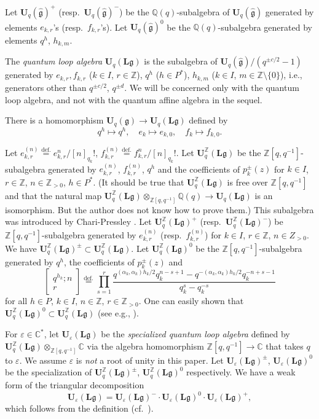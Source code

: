 \documentclass[12pt]{amsart}
\def\Bbb{\mathbb}
\theoremstyle{definition}
\theoremstyle{remark}
\numberwithin{equation}{subsection}
\newcommand{\defeq}{\overset{\operatorname{\scriptstyle def.}}{=}}
\newcommand{\C}{{\Bbb C}}
\newcommand{\Z}{{\Bbb Z}}
\newcommand{\Q}{{\Bbb Q}}
\newcommand{\Uq}{{\mathbf U}_q(\mathfrak g)} %
\newcommand{\Ua}{{\mathbf U}_q(\widehat{\mathfrak g})} %
\newcommand{\Ul}{{\mathbf U}_q({\mathbf L}{\mathfrak g})} %
\newcommand{\Uli}{{\mathbf U}^{\Z}_q({\mathbf L}\mathfrak g)}
\newcommand{\Ule}{{\mathbf U}_{\varepsilon}({\mathbf L}\mathfrak g)}
\begin{document}
Let $\Ua^+$ (resp.\ $\Ua^-$) be the $\Q(q)$-subalgebra of $\Ua$
generated by elements $e_{k,r}$'s (resp.\ $f_{k,r}$'s).  Let $\Ua^0$
be the $\Q(q)$-subalgebra generated by elements $q^h$, $h_{k,m}$.

The {\it quantum loop algebra\/} $\Ul$ is the subalgebra
of $\Ua/(q^{\pm c/2} - 1)$ generated by 
$e_{k,r}, f_{k,r}$ ($k\in I$, $r\in\Z$), $q^h$ ($h \in P^*$),
$h_{k,m}$ ($k\in I$, $m\in \Z\setminus\{0\}$),
i.e., generators other than $q^{\pm c/2}$, $q^{\pm d}$.
We will be concerned only with the quantum loop algebra, and not with
the quantum affine algebra in the sequel.

There is a homomorphism $\Uq\to \Ul$ defined by
\begin{equation*}
   q^h \mapsto q^h, \quad
   e_k \mapsto e_{k,0}, \quad f_k \mapsto f_{k,0}.
\end{equation*}

Let $e_{k,r}^{(n)} \defeq e_{k,r}^n / [n]_{q_k}!$,
$f_{k,r}^{(n)} \defeq f_{k,r}^n / [n]_{q_k}!$.
%
Let $\Uli$ be the $\Z[q,q^{-1}]$-subalgebra generated by
$e_{k,r}^{(n)}$, $f_{k,r}^{(n)}$, $q^h$
and the coefficients of $p_k^\pm(z)$
for $k\in I$, $r\in \Z$, $n\in\Z_{> 0}$, $h\in P^*$.
%
(It should be true that
%
$\Uli$ is free over $\Z[q,q^{-1}]$ and
%
that the natural map $\Uli\otimes_{\Z[q,q^{-1}]}\Q(q) \to \Ul$ is an
isomorphism. But the author does not know how to prove them.)
%
This subalgebra was introduced by Chari-Pressley \cite{CP3}.
%
Let $\Uli^+$ (resp.\ $\Uli^-$) be $\Z[q,q^{-1}]$-subalgebra generated
by $e_{k,r}^{(n)}$ (resp.\ $f_{k,r}^{(n)}$) for $k\in I$, $r\in \Z$,
$n\in Z_{> 0}$. We have $\Uli^\pm\subset \Uli$.
%
Let $\Uli^0$ be the $\Z[q,q^{-1}]$-subalgebra generated by $q^h$, the
coefficients of $p_k^\pm(z)$ and
\begin{equation*}
   \begin{bmatrix}
      q^{h_k}; n \\ r
   \end{bmatrix}
   \defeq
   \prod_{s=1}^r \frac{q^{(\alpha_k,\alpha_k)h_k/2} q_k^{n-s+1}
   - q^{-(\alpha_k,\alpha_k)h_k/2} q_k^{-n+s-1}}{q_k^s - q_k^{-s}}
\end{equation*}
for all $h\in P$, $k\in I$, $n\in \Z$, $r\in \Z_{> 0}$. One can
easily shown that $\Uli^0\subset \Uli$ (see e.g.,
\cite[3.1.9]{Lu-Book}).

For $\varepsilon\in\C^*$, let $\Ule$ be the {\it specialized quantum
loop algebra\/} defined by $\Uli\otimes_{\Z[q,q^{-1}]}\C$ via the
algebra homomorphism $\Z[q,q^{-1}]\to \C$ that takes $q$ to
$\varepsilon$.
%
We assume $\varepsilon$ is {\it not\/} a root of unity in this paper.
%
Let $\Ule^\pm$, $\Ule^0$ be the specialization of $\Uli^\pm$, $\Uli^0$ 
respectively. We have a weak form of the triangular decomposition
\begin{equation}
\label{eq:weaktri}
   \Ule = \Ule^-\cdot \Ule^0\cdot \Ule^+,
\end{equation}
which follows from the definition (cf.~\cite[6.1]{CP3}).
\end{document}
